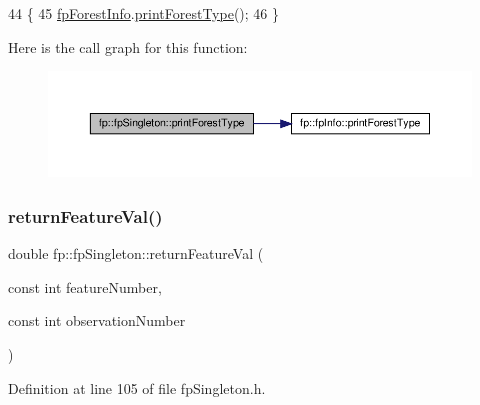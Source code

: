\begin{DoxyCode}
44                                          \{
45                 \hyperlink{classfp_1_1fpSingleton_a85965009befa72a749ae498fa5b6ccfa}{fpForestInfo}.\hyperlink{classfp_1_1fpInfo_a1acfffe3b13e5cad548f92cd09ff7f46}{printForestType}();
46             \}
\end{DoxyCode}
Here is the call graph for this function\+:\nopagebreak
\begin{figure}[H]
\begin{center}
\leavevmode
\includegraphics[width=350pt]{classfp_1_1fpSingleton_ad9696336521f72c7c6a021608799871e_cgraph}
\end{center}
\end{figure}
\mbox{\label{classfp_1_1fpSingleton_aacc2eb894a219e2fe234743b51fa1a76}} 
\subsubsection{\texorpdfstring{return\+Feature\+Val()}{returnFeatureVal()}}
{\footnotesize\ttfamily double fp\+::fp\+Singleton\+::return\+Feature\+Val (\begin{DoxyParamCaption}\item[{const int}]{feature\+Number,  }\item[{const int}]{observation\+Number }\end{DoxyParamCaption})\hspace{0.3cm}{\ttfamily [inline]}}



Definition at line 105 of file fp\+Singleton.\+h.


